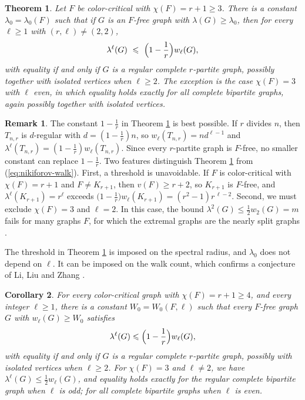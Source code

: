 \documentclass[11pt, a4paper]{article}
\newtheorem{theorem}{Theorem}[section]
\newtheorem{corollary}[theorem]{Corollary}
\theoremstyle{definition}
\newtheorem{remark}{Remark}
\theoremstyle{plain}
\renewcommand{\le}{\leqslant}
\renewcommand{\ge}{\geqslant}
\begin{document}
\begin{theorem}
\label{thm:large-lambda}
Let $F$ be color-critical with
$\chi (F)=r+1\ge 3$. There is a constant
$\lambda_0=\lambda_0(F)$ such that
if $G$ is an $F$-free
graph with $\lambda (G)\ge \lambda_0$, then for every  $\ell \ge 1$ with
$(r,\ell )\neq (2,2)$, 
\begin{equation}  \label{eq:main-bound}
  \lambda^{\ell}(G)\ \le\
  \Bigl(1-\frac{1}{r}\Bigr)w_{\ell}(G),
\end{equation}
with equality if and only if $G$ is a regular complete
$r$-partite graph, possibly together with isolated
vertices when $\ell \ge 2$. The exception is the
case $\chi (F)=3$ with $\ell$ even, in which equality holds
exactly for all complete bipartite graphs, again possibly
together with isolated vertices. 
\end{theorem}


\begin{remark}
The constant $1-\frac1r$ in Theorem
\ref{thm:large-lambda} is best possible. If $r$
divides $n$, then $T_{n,r}$ is $d$-regular with
$d=(1-\frac1r)n$, so 
$w_\ell (T_{n,r})=nd^{\ell -1}$ and $\lambda^\ell (T_{n,r})
 =(1-\frac1r)w_\ell (T_{n,r})$. Since every
$r$-partite graph is $F$-free, no smaller constant
can replace $1-\frac1r$. 
Two features distinguish Theorem \ref{thm:large-lambda} from (\ref{eq:nikiforov-walk}). First, a threshold is
unavoidable. If $F$ is color-critical with
$\chi (F)=r+1$ and $F\neq K_{r+1}$, then
$v(F)\ge r+2$, so $K_{r+1}$ is $F$-free,
and $\lambda^{\ell}(K_{r+1})= r^{\ell}$
exceeds $\bigl(1-\frac1r\bigr)w_\ell (K_{r+1})
 =(r^{2}-1)r^{\, \ell -2}$. 
Second, we must exclude $\chi (F)=3$ and $\ell =2$.
In this case, the bound $\lambda^2 (G) \le \frac{1}{2}w_2(G) = m$ fails for many graphs $F$, for which the extremal graphs are the nearly split graphs \cite{LZS2024, LLZ-Critical}.
\end{remark}

The threshold in Theorem \ref{thm:large-lambda} is imposed on the spectral radius, and $\lambda_0$ does not depend on $\ell$. It can be imposed on the walk count, which confirms a conjecture of Li, Liu and Zhang \cite{LLZ-Critical}. 

\begin{corollary} \label{cor:threshold-walks} 
For every color-critical graph with $\chi (F)=r+1 \ge 4$, and every integer $\ell \ge 1$,  
there is a constant $W_0=W_0(F,\ell )$ such
that every $F$-free graph $G$ with
$w_\ell (G)\ge W_0$ satisfies 
\begin{equation*}
  \lambda^\ell (G)\le
  \Bigl(1-\frac{1}{r}\Bigr)w_\ell (G),
\end{equation*}
with equality if and only if $G$ is a 
regular complete $r$-partite graph, possibly with
isolated vertices when $\ell \ge 2$. 
For $\chi (F)=3$ and $\ell \neq 2$, we have $\lambda^{\ell} (G)\le \frac{1}{2}w_{\ell} (G)$, and equality holds exactly for 
the regular complete bipartite graph when $\ell$ is odd; 
 for all complete bipartite graphs when $\ell$ is even. 
\end{corollary}
\end{document}
